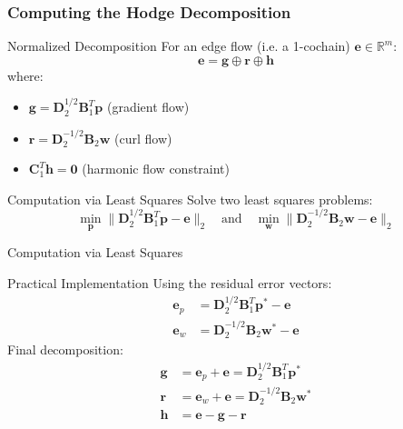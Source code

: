 \documentclass[aspectratio=169,xcolor=dvipsnames]{beamer}
\begin{document}
\begin{frame}
\frametitle{Computing the Hodge Decomposition}
\begin{block}{Normalized Decomposition}
For an edge flow (i.e. a 1-cochain) $\boldsymbol{e} \in \mathbb{R}^{m}$:
\begin{equation*}
\boldsymbol{e} = \boldsymbol{g} \oplus \boldsymbol{r} \oplus \boldsymbol{h}
\end{equation*}
where:
\begin{itemize}
\item $\boldsymbol{g} = \boldsymbol{D}_2^{1/2}\boldsymbol{B}_1^{T}\boldsymbol{p}$ (gradient flow)
\item $\boldsymbol{r} = \boldsymbol{D}_2^{-1/2}\boldsymbol{B}_2\boldsymbol{w}$ (curl flow)
\item $\boldsymbol{C}_1^{T}\boldsymbol{h} = \boldsymbol{0}$ (harmonic flow constraint)
\end{itemize}
\end{block}
\begin{block}{Computation via Least Squares}
Solve two least squares problems:
\begin{equation*}
\min_{\boldsymbol{p}} \|\boldsymbol{D}_2^{1/2}\boldsymbol{B}_1^{T}\boldsymbol{p} - \boldsymbol{e}\|_2 \quad \text{and} \quad \min_{\boldsymbol{w}} \|\boldsymbol{D}_2^{-1/2}\boldsymbol{B}_2\boldsymbol{w} - \boldsymbol{e}\|_2
\end{equation*}
\end{block}
\end{frame}
\begin{frame}{Computation via Least Squares}
\begin{block}{Practical Implementation}
Using the residual error vectors:
\begin{align*}
\boldsymbol{e}_p &= \boldsymbol{D}_2^{1/2}\boldsymbol{B}_1^{T}\boldsymbol{p}^* - \boldsymbol{e}\\
\boldsymbol{e}_w &= \boldsymbol{D}_2^{-1/2}\boldsymbol{B}_2\boldsymbol{w}^* - \boldsymbol{e}
\end{align*}
\vspace{0.5em}
Final decomposition:
\begin{align*}
\boldsymbol{g} &= \boldsymbol{e}_p + \boldsymbol{e} = \boldsymbol{D}_2^{1/2}\boldsymbol{B}_1^{T}\boldsymbol{p}^*\\
\boldsymbol{r} &= \boldsymbol{e}_w + \boldsymbol{e} = \boldsymbol{D}_2^{-1/2}\boldsymbol{B}_2\boldsymbol{w}^*\\
\boldsymbol{h} &= \boldsymbol{e} - \boldsymbol{g} - \boldsymbol{r}
\end{align*}
\end{block}
\end{frame}
\end{document}
